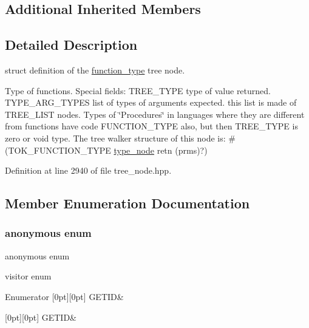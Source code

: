 \subsection*{Additional Inherited Members}


\subsection{Detailed Description}
struct definition of the \hyperlink{structfunction__type}{function\+\_\+type} tree node. 

Type of functions. Special fields\+: T\+R\+E\+E\+\_\+\+T\+Y\+PE type of value returned. T\+Y\+P\+E\+\_\+\+A\+R\+G\+\_\+\+T\+Y\+P\+ES list of types of arguments expected. this list is made of T\+R\+E\+E\+\_\+\+L\+I\+ST nodes. Types of \char`\"{}\+Procedures\char`\"{} in languages where they are different from functions have code F\+U\+N\+C\+T\+I\+O\+N\+\_\+\+T\+Y\+PE also, but then T\+R\+E\+E\+\_\+\+T\+Y\+PE is zero or void type. The tree walker structure of this node is\+: \#(T\+O\+K\+\_\+\+F\+U\+N\+C\+T\+I\+O\+N\+\_\+\+T\+Y\+PE \hyperlink{structtype__node}{type\+\_\+node} retn (prms)?) 

Definition at line 2940 of file tree\+\_\+node.\+hpp.



\subsection{Member Enumeration Documentation}
\mbox{\label{structfunction__type_ad1dd6411d535f0d3b7493f74f4b72b1e}} 
\subsubsection{\texorpdfstring{anonymous enum}{anonymous enum}}
{\footnotesize\ttfamily anonymous enum}



visitor enum 

\begin{DoxyEnumFields}{Enumerator}
[0pt][0pt]{}\mbox{\label{structfunction__type_ad1dd6411d535f0d3b7493f74f4b72b1eaed665a91f2c85dcfd1399d4d54a3d4e1}} 
G\+E\+T\+ID&\\
\hline

[0pt][0pt]{}\mbox{\label{structfunction__type_ad1dd6411d535f0d3b7493f74f4b72b1eaed665a91f2c85dcfd1399d4d54a3d4e1}} 
G\+E\+T\+ID&\\
\hline

\end{DoxyEnumFields}


